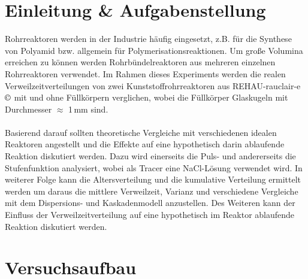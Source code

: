 \documentclass[12pt,liststotoc]{report}
\begin{document}
\tableofcontents
\newpage
{}
\chapter{Einleitung \& Aufgabenstellung}

\par Rohrreaktoren werden in der Industrie häufig eingesetzt, z.B. für die Synthese von Polyamid bzw. allgemein für Polymerisationsreaktionen. \cite{fogler1999elements,Chemgapedia}
Um große Volumina erreichen zu können werden Rohrbündelreaktoren aus mehreren einzelnen Rohrreaktoren verwendet. Im Rahmen dieses Experiments werden die realen Verweilzeitverteilungen von zwei Kunststoffrohrreaktoren aus REHAU-rauclair-e $\copyright$ mit und ohne Füllkörpern verglichen, wobei die Füllkörper Glaskugeln mit Durchmesser $\approx$ 1\,mm sind. 
\\
\\
Basierend darauf sollten theoretische Vergleiche mit verschiedenen idealen Reaktoren angestellt und die Effekte auf eine hypothetisch darin ablaufende Reaktion diskutiert werden. Dazu wird einerseits die Puls- und andererseits die Stufenfunktion analysiert, wobei als Tracer eine NaCl-Lösung verwendet wird. In weiterer Folge kann die Altersverteilung und die kumulative Verteilung ermittelt werden um daraus die mittlere Verweilzeit, Varianz und verschiedene Vergleiche mit dem Dispersions- und Kaskadenmodell anzustellen. Des Weiteren kann der Einfluss der Verweilzeitverteilung auf eine hypothetisch im Reaktor ablaufende Reaktion diskutiert werden.






\chapter{Versuchsaufbau}
\end{document}
